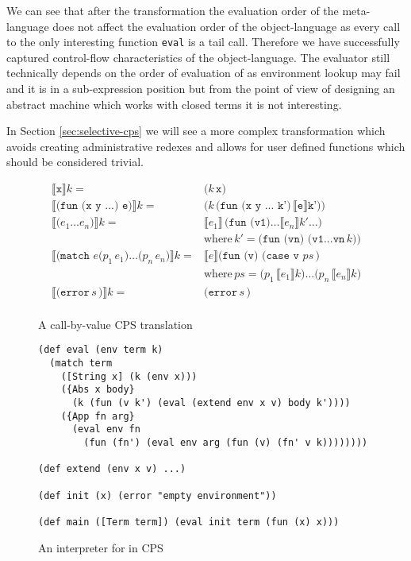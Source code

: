 We can see that after the transformation the evaluation order of the meta-language does not affect the evaluation order of the object-language as every call to the only interesting function \lstinline!eval! is a tail call.
Therefore we have successfully captured control-flow characteristics of the object-language.
The evaluator still technically depends on the order of evaluation of \IDL{} as environment lookup may fail and it is in a sub-expression position but from the point of view of designing an abstract machine which works with closed terms it is not interesting.

In Section \ref{sec:selective-cps} we will see a more complex transformation which avoids creating administrative redexes and allows for user defined functions which should be considered trivial.

\begin{figure}
    \centering
   \begin{align*}
        \llbracket \texttt{x} \rrbracket k =& \texttt{(}k\,\texttt{x)}\\
%
        \llbracket \texttt{(fun (x y ...) e)} \rrbracket k
        =& \texttt{(} k \, \texttt{(fun (x y ... k')}\, \llbracket \texttt{e} \rrbracket \texttt{k'))} \\
%        
        \llbracket \texttt{(}e_1\ldots e_n\texttt{)} \rrbracket k
        =& \llbracket e_1 \rrbracket \, \texttt{(fun (v1)} \ldots \llbracket e_n \rrbracket k' \ldots \texttt{)}\, \\
         & \text{where}\,k' = \texttt{(fun (vn) (v1...vn}\,k\texttt{))} \\
%        
        \llbracket \texttt{(match } e \texttt{(} p_1\,e_1\texttt{)}\ldots \texttt{(} p_n\,e_n\texttt{)} \rrbracket k
        =& \llbracket e \rrbracket \texttt{(fun (v) (case v }ps \,\texttt{)}\\
         & \text{where}\,ps = \texttt{(} p_1\,\llbracket e_1 \rrbracket k  \texttt{)}\ldots \texttt{(} p_n\,\llbracket e_n \rrbracket k \texttt{)}\\
%
        \llbracket \texttt{(error}\,s\,\texttt{)} \rrbracket k
        =& \texttt{(error}\,s\,\texttt{)} \\
   \end{align*}
    \caption{A call-by-value CPS translation}
    \label{fig:cps-translation}
\end{figure}

\begin{figure}
    \centering
\begin{lstlisting}
(def eval (env term k)
  (match term
    ([String x] (k (env x)))
    ({Abs x body}
      (k (fun (v k') (eval (extend env x v) body k'))))
    ({App fn arg}
      (eval env fn 
        (fun (fn') (eval env arg (fun (v) (fn' v k))))))))
    
(def extend (env x v) ...)
    
(def init (x) (error "empty environment"))
    
(def main ([Term term]) (eval init term (fun (x) x)))
\end{lstlisting}
    \caption{An interpreter for \LC{} in CPS}
    \label{fig:lambda-calc-interp-cps}
\end{figure}

